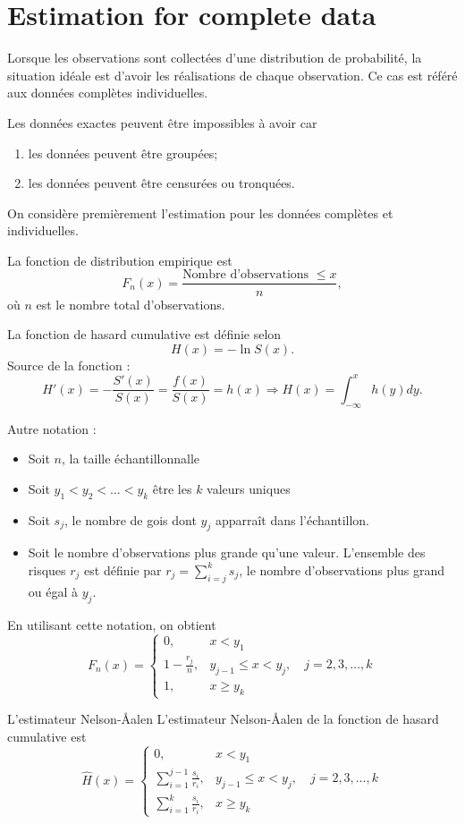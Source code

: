 \chapter{Estimation for complete data}

Lorsque les observations sont collectées d'une distribution de probabilité, la situation idéale est d'avoir les réalisations de chaque observation. Ce cas est référé aux données complètes individuelles. 

Les données exactes peuvent être impossibles à avoir car
\begin{enumerate}
	\item les données peuvent être groupées;
	\item les données peuvent être censurées ou tronquées. 
\end{enumerate}

On considère premièrement l'estimation pour les données complètes et individuelles. 

\begin{definition}{}{}
	La fonction de distribution empirique est 
	$$F_n(x) = \frac{\text{Nombre d'observations }\leq x}{n},$$
	où $n$ est le nombre total d'observations. 
\end{definition}

\begin{definition}{}{}
	La fonction de hasard cumulative est définie selon 
	$$H(x) = -\ln S(x).$$
	\tcblower
	Source de la fonction : 
	$$H'(x) = -\frac{S'(x)}{S(x)} = \frac{f(x)}{S(x)} = h(x) \Rightarrow H(x) = \int_{-\infty}^{x} h(y) dy.$$
\end{definition}

Autre notation : 

\begin{itemize}
	\item Soit $n$, la taille échantillonnalle
	\item Soit $y_1<y_2<\dots<y_k$ être les $k$ valeurs uniques
	\item Soit $s_j$, le nombre de gois dont $y_j$ apparraît dans l'échantillon. 
	\item Soit le nombre d'observations plus grande qu'une valeur. L'ensemble des risques $r_j$ est définie par $r_j = \sum_{i = j}^{k}s_j$, le nombre d'observations plus grand ou égal à $y_j$.
\end{itemize}
En utilisant cette notation, on obtient
$$F_n(x) = \begin{cases}
0,&x<y_1\\
1-\frac{r_j}{n}, & y_{j-1}\leq x < y_j,\quad j = 2, 3, \dots, k\\
1,& x\geq y_k
\end{cases}$$

\begin{definition}{L'estimateur Nelson-\AA{}alen}{}
	L'estimateur Nelson-\AA{}alen de la fonction de hasard cumulative est 
	$$\hat{H}(x) = \begin{cases}
	0,&x<y_1\\
	\sum_{i = 1}^{j-1} \frac{s_i}{r_i}, & y_{j-1}\leq x < y_j,\quad j = 2, 3, \dots, k\\
	\sum_{i = 1}^{k} \frac{s_i}{r_i},& x\geq y_k
	\end{cases}$$
\end{definition}